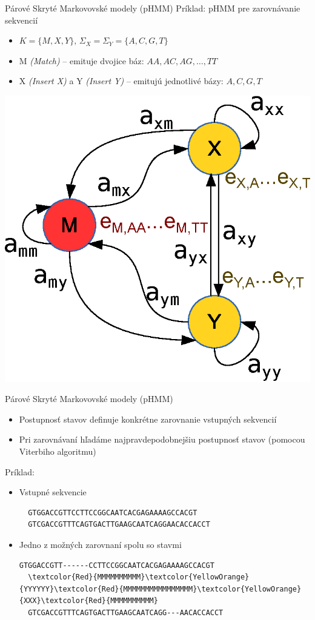 \documentclass[xcolor=dvipsnames, compress, 12pt]{beamer}
\theoremstyle{definition}
\begin{document}
\begin{frame}{Párové Skryté Markovovské modely (pHMM)}
  Príklad: pHMM pre zarovnávanie sekvencií
  \begin{itemize}
      \item $K = \{M, X, Y\},\, \Sigma_X = \Sigma_Y = \{A, C, G, T\}$
      \item M \textit{(Match)} -- emituje dvojice báz: $AA, AC, AG,\dots, TT$
      \item X \textit{(Insert X)} a Y \textit{(Insert Y)} -- emitujú jednotlivé bázy: $A,C,G,T$
  \end{itemize}
  \begin{center}
  \includegraphics[width=.30\textwidth]{images/simple_model}
  \end{center}
\end{frame}

\begin{frame}[fragile]{Párové Skryté Markovovské modely (pHMM)}
  \begin{itemize}
      \item Postupnosť stavov definuje konkrétne zarovnanie vstupných sekvencií
      \item Pri zarovnávaní hľadáme najpravdepodobnejšiu postupnosť stavov (pomocou Viterbiho algoritmu)
  \end{itemize}
  \pause
   Príklad:
  \begin{itemize}
  \item Vstupné sekvencie
  \begin{verbatim}
  GTGGACCGTTCCTTCCGGCAATCACGAGAAAAGCCACGT
  GTCGACCGTTTCAGTGACTTGAAGCAATCAGGAACACCACCT
  \end{verbatim}
  \item Jedno z možných zarovnaní spolu so stavmi
  \begin{Verbatim}[commandchars=\\\{\}]
  GTGGACCGTT------CCTTCCGGCAATCACGAGAAAAGCCACGT
  \textcolor{Red}{MMMMMMMMMM}\textcolor{YellowOrange}{YYYYYY}\textcolor{Red}{MMMMMMMMMMMMMMMM}\textcolor{YellowOrange}{XXX}\textcolor{Red}{MMMMMMMMMM}
  GTCGACCGTTTCAGTGACTTGAAGCAATCAGG---AACACCACCT
  \end{Verbatim}
  \end{itemize}
\end{frame}
\end{document}
